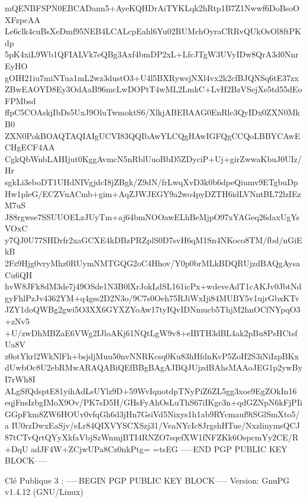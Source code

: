 \documentclass{../res/univ-projet}
\begin{document}
mQENBFSPN0EBCADann5+AyeKQHDrAiTYKLqk2hRtp1B7Z1Nwwf6DoBsoOXFzpcAA
Le6clk4cuBsXeDmf95NEB4LCALcpEahl6Yu02RUMchOyraCRRvQUkOsOl8ftPKdp
5pK4xiL9Wb1QFIALVk7eQBg3Axf4bmDP2xL+LfcJTgW3UVyIDw8QrA3d0NnrEyHO
gOIH21iu7miNTua1mL2wz3dustO3+U4l5BXRywsjNXl4vx2k2cfBJQNSq6tE37zx
ZBwEAOYD8Ey3OdAaB96mcLwDOPtT4wML2LmkC+LvH2BzVSejXe5td55dEoFPMbsd
ffpC5COAskjIbDs5UxJ9OluTwmoktS6/XlkjABEBAAG0EnRlc3QyIDx0ZXN0MkB0
ZXN0PokBOAQTAQIAIgUCVI83QQIbAwYLCQgHAwIGFQgCCQoLBBYCAwECHgECF4AA
CgkQbWnbLAHIjut0KggAvmcN5nRblUuoBbD5ZDyciP+Uj+girZwwaKbuJ0UIz/Hr
sgkLi3eboDT1UHdNIVgjdcI8jZBgk/Z9dN/frLwqXvD3k0b6dpeQiumv9ETgbuDp
Hw1pleG/ECZVuACmb+gim+AqZJWJEGY9a2wo4pyDZTH6idLVNntBL72lzIEzM7uS
J88rgwse7SSUUOELzJUyTm+aj64bmNOOawELhBeMjpO97xYAGeq26daxUgYsVOxC
y7QJ0U77SHDrfr2xaGCXE4kDBzPRZplS0D7svH6qM1Sn4NKoco8TM/fbd/nGiEkB
2Fz9Hjg0vryMhz0RUymNMTGQG2oC4Hhov/Y0p0brMLkBDQRUjzdBAQgAysaCu6QH
hvW8JFk8dM3de7j49OSde1N3B0lXrJokLdSL161icPx+wdeveAdT1cAKJv0JbtNd
gyFhlPzJv4362YM+q4gss2D2N3o/9C7s0Oeh75RJiWxIji84MUBY5v1ujrGbxKTv
JZY1doQWBg2gwi5O3XX6GYXZYoAw17tyIQvIDNmucb5ThjM2hnOCfNYpqO3+zNv5
+U/zwDhMBZaE6VWg2IJloAKj61NQtLgW9v8+eIBTH3dBL4ak2pBu8PsHCtsfUa8V
z0otYkrl2WkNlFh+bsjdjMuu50nvNNRKcsq0Ku83hHfdnKvP5ZoH2S3iNiIzpBKx
dUwbOc8U2ebRMwARAQABiQEfBBgBAgAJBQJUjzdBAhsMAAoJEG1p2ywByI7rWh8I
ALgSfQdsptE81yihAdLsUYlz9D+59WvIqnotdpTNyPiZ6ZL5gg3xoe9EgZOkIn16
eqjFnsIzbgIMoX9Ov/PK7sD5H/GHsFyAhOsLuThS67iIKgc3n+qdGZNpN6kFjPIi
GGpFkm8ZW6HOUv0vfqGh6d3jHn7GsiVd5Nixys1h1ab9RYcmauf9iSGlSmXto5/a
IU0rzDwxEaSjv/eLr84QIXVYSCXSzj31/VeaNYcIc8JrgshHTue/NxzlinymsQCJ
87tCTvQrtQYyXkfaVbjSzWnmjBTI4RNZO7sqefXW1fNFZKk6OspcmYy2CE/R+DqU
adJF4W+ZCjwUPa8Cz0nkPtg=
=tsEG
-----END PGP PUBLIC KEY BLOCK-----


Clé Publique 3 :
-----BEGIN PGP PUBLIC KEY BLOCK-----
Version: GnuPG v1.4.12 (GNU/Linux)
\end{document}

